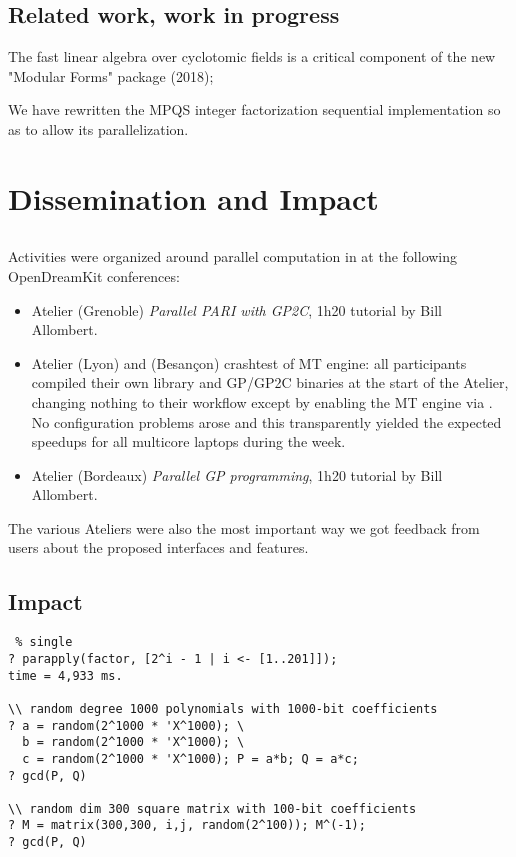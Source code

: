 \documentclass{deliverablereport}
\begin{document}
\subsection{Related work, work in progress}

The fast linear algebra over cyclotomic fields is a critical component
of the new "Modular Forms" package (2018);

We have rewritten the MPQS integer factorization sequential implementation so
as to allow its parallelization.

\section{Dissemination and Impact}

\subsection{}
Activities were organized around parallel computation in \PariGP
at the following OpenDreamKit conferences:
\begin{itemize}
  \item Atelier  (Grenoble) \emph{Parallel PARI with GP2C},
  1h20 tutorial by Bill Allombert.
  \item Atelier  (Lyon) and  (Besançon)
  crashtest of MT engine: all participants compiled their own \Pari library and
  GP/GP2C  binaries at the start of the Atelier, changing nothing to their
  workflow except by enabling the MT engine via .
  No configuration problems arose and this transparently yielded the expected
  speedups for all multicore laptops during the week.

  \item Atelier  (Bordeaux) \emph{Parallel GP programming},
  1h20 tutorial by Bill Allombert.
\end{itemize}
The various Ateliers were also the most important way we got feedback from
users about the proposed interfaces and features.

\subsection{Impact}

\begin{verbatim} % single
? parapply(factor, [2^i - 1 | i <- [1..201]]);
time = 4,933 ms.

\\ random degree 1000 polynomials with 1000-bit coefficients
? a = random(2^1000 * 'X^1000); \
  b = random(2^1000 * 'X^1000); \
  c = random(2^1000 * 'X^1000); P = a*b; Q = a*c;
? gcd(P, Q)

\\ random dim 300 square matrix with 100-bit coefficients
? M = matrix(300,300, i,j, random(2^100)); M^(-1);
? gcd(P, Q)
\end{verbatim}
\end{document}
